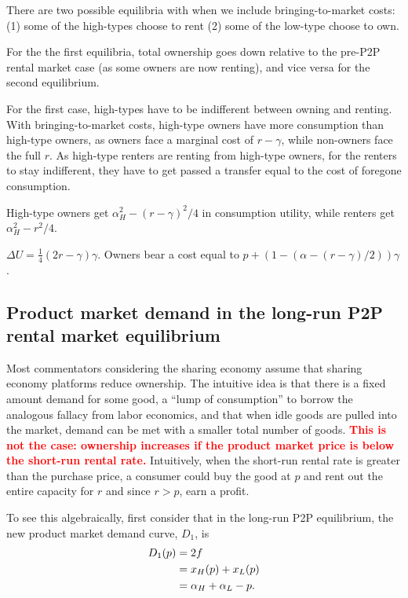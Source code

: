 \documentclass[11pt]{article}
\newcommand{\important}[1]{\textcolor{red}{\textbf{#1}}}
\newcommand{\important}[1]{#1}
\begin{document}
There are two possible equilibria with when we include bringing-to-market costs:
(1) some of the high-types choose to rent 
(2) some of the low-type choose to own. 

For the the first equilibria, total ownership goes down relative to the pre-P2P rental market case (as some owners are now renting), and vice versa for the second equilibrium. 

For the first case, high-types have to be indifferent between owning and renting.
With bringing-to-market costs, high-type owners have more consumption than high-type owners, as owners face a marginal cost of $r-\gamma$, while non-owners face the full $r$.
As high-type renters are renting from high-type owners, for the renters to stay indifferent, they have to get passed a transfer equal to the cost of foregone consumption.

High-type owners get $\alpha_H^2 - (r-\gamma)^2/4$ in consumption utility, while renters get $\alpha_H^2 - r^2/4$.

$\Delta U = \frac{1}{4}(2r - \gamma)\gamma$.
Owners bear a cost equal to $p + (1 - (\alpha - (r - \gamma)/2))\gamma$. 




\subsection{Product market demand in the long-run P2P rental market equilibrium} 
Most commentators considering the sharing economy assume that sharing economy platforms reduce ownership. 
The intuitive idea is that there is a fixed amount demand for some good, a ``lump of consumption'' to borrow the analogous fallacy from labor economics, and that when idle goods are pulled into the market, demand can be met with a smaller total number of goods.
\important{This is not the case:  
ownership increases if the product market price is below the short-run rental rate.} 
Intuitively, when the short-run rental rate is greater than the purchase price, a consumer could buy the good at $p$ and rent out the entire capacity for $r$ and since $r > p$, earn a profit. 

To see this algebraically, first consider that in the long-run P2P equilibrium, the new product market demand curve, $D_1$, is
\begin{align}
D_1(p) &= 2f \notag \\  
     &= x_H(p) + x_L(p) \notag \\ 
     &= \alpha_H + \alpha_L - p.  
\end{align} 
\end{document}

